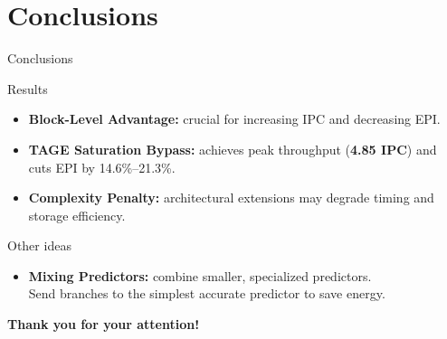 \documentclass[aspectratio=169]{beamer}
\begin{document}
\section{Conclusions}
\begin{frame}{Conclusions}
    \begin{block}{Results}
        \begin{itemize}
            \item \textbf{Block-Level Advantage:} crucial for increasing IPC and decreasing EPI.
            \item \textbf{TAGE Saturation Bypass:} achieves peak throughput (\textbf{4.85 IPC}) and cuts EPI by 14.6\%--21.3\%.
            \item \textbf{Complexity Penalty:} architectural extensions may degrade timing and storage efficiency.
        \end{itemize}
    \end{block}
    \begin{block}{Other ideas}
        \begin{itemize}
            \item \textbf{Mixing Predictors:} combine smaller, specialized predictors. \\
            Send branches to the simplest accurate predictor to save energy.
        \end{itemize}
    \end{block}
\end{frame}

\begin{frame}[plain, c]
    \centering
    \Huge \textcolor{PoliBlue}{\textbf{Thank you for your attention!}}
\end{frame}

\appendix
\end{document}
